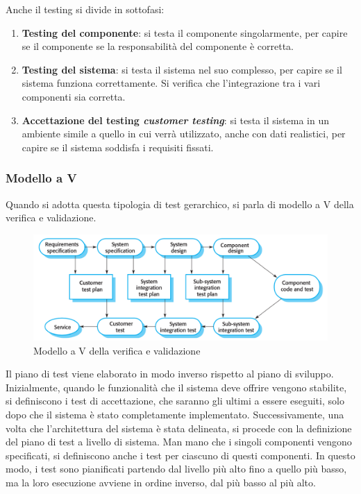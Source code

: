 Anche il testing si divide in sottofasi:
\begin{enumerate}
    \item \textbf{Testing del componente}: si testa il componente singolarmente,
    per capire se il componente se la responsabilità del componente è corretta.
    \item \textbf{Testing del sistema}: si testa il sistema nel suo complesso,
    per capire se il sistema funziona correttamente. Si verifica che l'integrazione 
    tra i vari componenti sia corretta.
    \item \textbf{Accettazione del testing \textit{customer testing}}: si testa il sistema
    in un ambiente simile a quello in cui verrà utilizzato, anche con 
    dati realistici, per capire se il sistema
    soddisfa i requisiti fissati.
\end{enumerate}
\subsubsection{Modello a V}
Quando si adotta questa tipologia di test gerarchico, si parla di modello a V della 
verifica e validazione.
\begin{figure}[H]
    \centering
    \includegraphics[scale=0.3]{img/validation.png}
    \caption{Modello a V della verifica e validazione}
\end{figure}
Il piano di test viene elaborato in modo inverso rispetto al piano di sviluppo.
Inizialmente, quando le funzionalità che il sistema deve offrire vengono stabilite,
si definiscono i test di accettazione, che saranno gli ultimi a essere eseguiti,
solo dopo che il sistema è stato completamente implementato. Successivamente, una
volta che l'architettura del sistema è stata delineata, si procede con la definizione
del piano di test a livello di sistema. Man mano che i singoli componenti vengono
specificati, si definiscono anche i test per ciascuno di questi componenti. In
questo modo, i test sono pianificati partendo dal livello più alto fino a quello
più basso,
ma la loro esecuzione avviene in ordine inverso, dal più basso al più alto.
